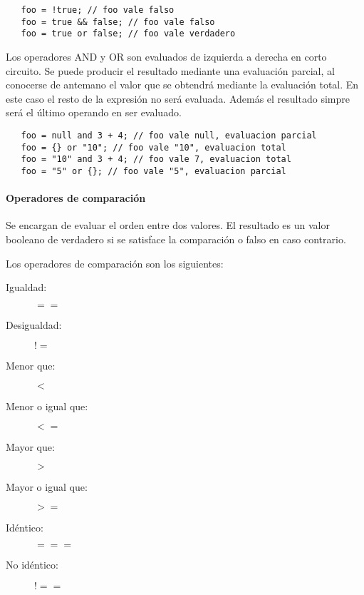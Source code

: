 \begin{lstlisting}
   foo = !true; // foo vale falso
   foo = true && false; // foo vale falso
   foo = true or false; // foo vale verdadero
\end{lstlisting} 


Los operadores AND y OR son evaluados de izquierda a derecha en corto circuito. Se puede producir el resultado mediante una evaluación parcial, al conocerse de antemano el 
valor que se obtendrá mediante la evaluación total. En este caso el resto de la expresión no será evaluada. Además el resultado simpre será el último operando en ser evaluado. \\
 
\begin{lstlisting}
   foo = null and 3 + 4; // foo vale null, evaluacion parcial 
   foo = {} or "10"; // foo vale "10", evaluacion total
   foo = "10" and 3 + 4; // foo vale 7, evaluacion total
   foo = "5" or {}; // foo vale "5", evaluacion parcial
\end{lstlisting} 



\paragraph{Operadores de comparación}\label{sec:op_cmp}
Se encargan de evaluar el orden entre dos valores. El resultado es un valor booleano de verdadero si se satisface la comparación o falso en caso contrario.

Los operadores de comparación son los siguientes:

\begin{description}
\item [Igualdad:] $==$
\item [Desigualdad:] $!=$
\item [Menor que:] $<$
\item [Menor o igual que:] $<=$
\item [Mayor que:] $>$
\item [Mayor o igual que:] $>=$
\item [Idéntico:] $===$
\item [No idéntico:] $!==$
\end{description} 


